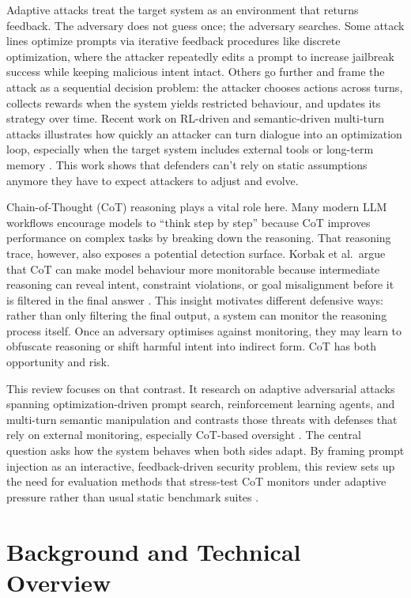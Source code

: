 \documentclass[conference]{IEEEtran}
\begin{document}
Adaptive attacks treat the target system as an environment that returns feedback. The adversary does not guess once; the adversary searches. Some attack lines optimize prompts via iterative feedback procedures like discrete optimization, where the attacker repeatedly edits a prompt to increase jailbreak success while keeping malicious intent intact. Others go further and frame the attack as a sequential decision problem: the attacker chooses actions across turns, collects rewards when the system yields restricted behaviour, and updates its strategy over time. Recent work on RL-driven and semantic-driven multi-turn attacks illustrates how quickly an attacker can turn dialogue into an optimization loop, especially when the target system includes external tools or long-term memory \cite{b14,b15,b16}. This work shows that defenders can’t rely on static assumptions anymore they have to expect attackers to adjust and evolve.

Chain-of-Thought (CoT) reasoning plays a vital role here. Many modern LLM workflows encourage models to “think step by step” because CoT improves performance on complex tasks by breaking down the reasoning. That reasoning trace, however, also exposes a potential detection surface. Korbak et al.\ argue that CoT can make model behaviour more monitorable because intermediate reasoning can reveal intent, constraint violations, or goal misalignment before it is filtered in the final answer \cite{b6}. This insight motivates different defensive ways: rather than only filtering the final output, a system can monitor the reasoning process itself. Once an adversary optimises against monitoring, they may learn to obfuscate reasoning or shift harmful intent into indirect form\cite{b6,b7}. CoT has both opportunity and risk.

This review focuses on that contrast. It  research on adaptive adversarial attacks spanning optimization-driven prompt search, reinforcement learning agents, and multi-turn semantic manipulation and contrasts those threats with defenses that rely on external monitoring, especially CoT-based oversight \cite{b6,b14,b15,b16}. The central question asks how the system behaves when both sides adapt. By framing prompt injection as an interactive, feedback-driven security problem, this review sets up the need for evaluation methods that stress-test CoT monitors under adaptive pressure rather than usual static benchmark suites \cite{b1,b3,b17}.

\section{Background and Technical Overview}
\end{document}
